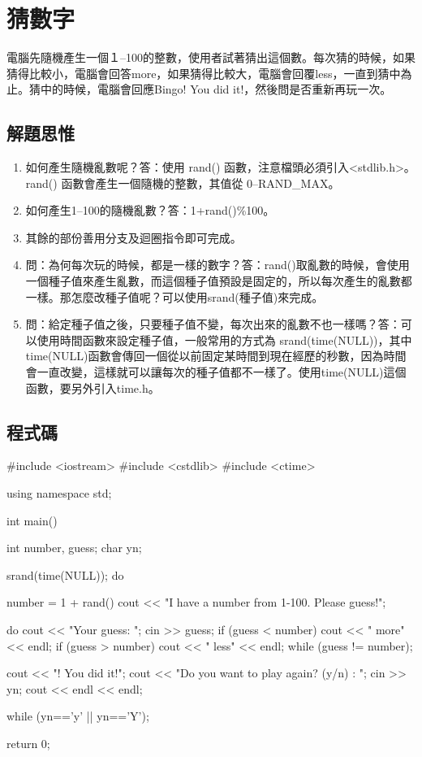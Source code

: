 \section{猜數字}

電腦先隨機產生一個１--100的整數，使用者試著猜出這個數。每次猜的時候，如果猜得比較小，電腦會回答more，如果猜得比較大，電腦會回覆less，一直到猜中為止。猜中的時候，電腦會回應Bingo! You did it!，然後問是否重新再玩一次。

\subsection{解題思惟}
\begin{enumerate}
	\item 如何產生隨機亂數呢？答：使用 rand() 函數，注意檔頭必須引入<stdlib.h>。rand() 函數會產生一個隨機的整數，其值從 0--RAND\_MAX。
	\item 如何產生1--100的隨機亂數？答：1+rand()\%100。
	\item 其餘的部份善用分支及迴圈指令即可完成。
	\item 問：為何每次玩的時候，都是一樣的數字？答：rand()取亂數的時候，會使用一個種子值來產生亂數，而這個種子值預設是固定的，所以每次產生的亂數都一樣。那怎麼改種子值呢？可以使用srand(種子值)來完成。
	\item 問：給定種子值之後，只要種子值不變，每次出來的亂數不也一樣嗎？答：可以使用時間函數來設定種子值，一般常用的方式為 srand(time(NULL))，其中time(NULL)函數會傳回一個從以前固定某時間到現在經歷的秒數，因為時間會一直改變，這樣就可以讓每次的種子值都不一樣了。使用time(NULL)這個函數，要另外引入time.h。
\end{enumerate}

\subsection{程式碼}
\begin{cppcode}
#include <iostream>
#include <cstdlib>
#include <ctime>

using namespace std;

int main()
{
    int number, guess;
    char yn;

    srand(time(NULL));
    do {
        number = 1 + rand()%
        cout << "I have a number from 1-100. Please guess!\n\n";

        do {
            cout << "Your guess: ";
            cin >> guess;
            if (guess < number) cout << "  more" << endl;
            if (guess > number) cout << "  less" << endl;
        } while (guess != number);

        cout << "\nBingo! You did it!\n\n";
        cout << "Do you want to play again? (y/n) : ";
        cin >> yn;
        cout << endl << endl;

    } while (yn=='y' || yn=='Y');

    return 0;
}
\end{cppcode}
